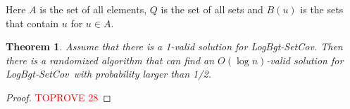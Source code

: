 \documentclass[11pt,a4paper]{article} \usepackage{enumitem}
\newcommand{\LBOsetcov}{\textsf{LogBgt-SetCov}}
\newtheorem{theorem}{Theorem}[section]
\theoremstyle{definition}
\begin{document}
Here $A$ is the set of all elements, $Q$ is the set of all sets and $B(u)$ is the sets that contain $u$ for $u\in A$.

\begin{theorem}
\label{thm:setcover}
Assume that there is a 1-valid solution for \LBOsetcov. Then there is a randomized algorithm that can find an $O(\log n)$-valid solution for \LBOsetcov\ with probability larger than 1/2. 
\end{theorem}

\begin{proof}\textcolor{red}{TOPROVE 28}\end{proof}
\newpage
%
 
\end{document}
